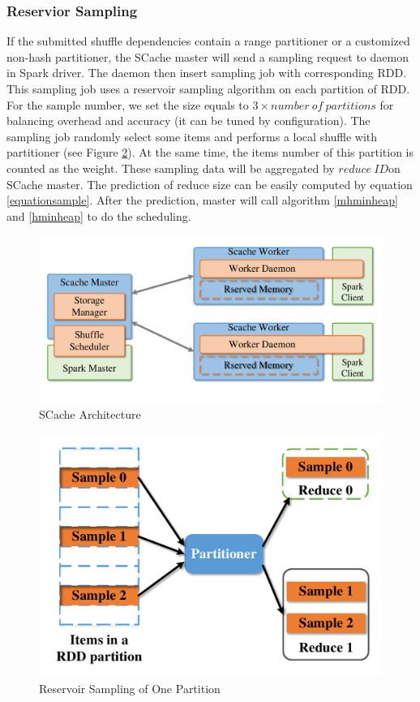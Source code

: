 \subsubsection{Reservior Sampling}\label{sampling}
If the submitted shuffle dependencies contain a range partitioner or a customized non-hash partitioner, the SCache master will send a sampling request to daemon in Spark driver. The daemon then insert sampling job with corresponding RDD. This sampling job uses a reservoir sampling algorithm\cite{reservoir} on each partition of RDD. For the sample number, we set the size equals to $3 \times number\ of\ partitions$ for balancing overhead and accuracy (it can be tuned by configuration). The sampling job randomly select some items and performs a local shuffle with partitioner (see Figure \ref{fig:sample}). At the same time, the items number of this partition is counted as the weight. These sampling data will be aggregated by $reduce\ ID$on SCache master. The prediction of reduce size can be easily computed by equation \ref{equationsample}. After the prediction, master will call algorithm \ref{mhminheap} and \ref{hminheap} to do the scheduling. 

\begin{figure}
	\centering
	\includegraphics[width=0.9\linewidth]{fig/arch}
	\caption{SCache Architecture}
	\label{fig:arch}
\end{figure}
\begin{figure}
	\centering
	\includegraphics[width=0.7\linewidth]{fig/sample}
	\caption{Reservoir Sampling of One Partition}
	\label{fig:sample}
\end{figure}

